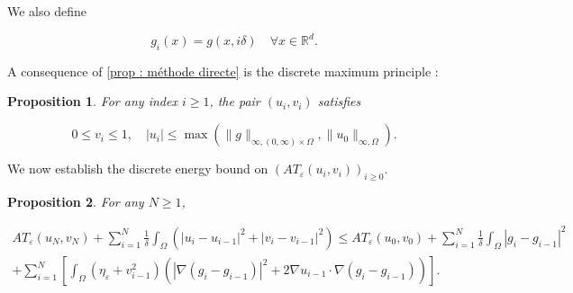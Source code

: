 \documentclass[reqno,12pt,twoside]{amsart}
\newtheorem{proposition}{Proposition}[section]
\numberwithin{equation}{section} \numberwithin{theorem}{section}
\numberwithin{proposition}{section} \numberwithin{lemma}{section}
\numberwithin{corollary}{section}
\numberwithin{definition}{section} \numberwithin{remark}{section}
\begin{document}
We also define 

\begin{equation}\label{gi}
g_i(x) = g(x, i\delta) \quad \forall x\in \mathbb{R}^d.
\end{equation} 


A consequence of \autoref{prop : méthode directe} is the discrete maximum principle :

\begin{proposition}\label{Maximum principle}
For any index $i\geqslant 1$, the pair $(u_i, v_i)$ satisfies

\begin{equation}\label{maximum principle}
0\leqslant v_i \leqslant 1, \quad |u_i| \leqslant \max(\|g\|_{\infty, (0,\infty)\times \Omega}, \|u_0\|_{\infty,\Omega}). 
\end{equation}
\end{proposition} 

We now establish the discrete energy bound on $(AT_\varepsilon (u_i, v_i))_{i\geqslant 0}$. 

\begin{proposition}\label{prop : energy bound discret}
For any $N\geqslant 1$, 

\begin{multline}\label{energy bound discret}
AT_\varepsilon (u_N, v_N) + \sum_{i=1}^N \frac{1}{\delta} \int_\Omega \left(|u_i -u_{i-1}|^2 + |v_i -v_{i-1}|^2\right) \leqslant AT_\varepsilon (u_0, v_0)+ \sum_{i=1}^N \frac{1}{\delta} \int_\Omega |g_i -g_{i-1}|^2\\
+ \sum_{i=1}^N \left[\int_\Omega (\eta_\varepsilon + v_{i-1} ^2) (|\nabla (g_i - g_{i-1})|^2 + 2\nabla u_{i-1} \cdot \nabla (g_i - g_{i-1}))\right].
\end{multline}
\end{proposition}
\end{document}
